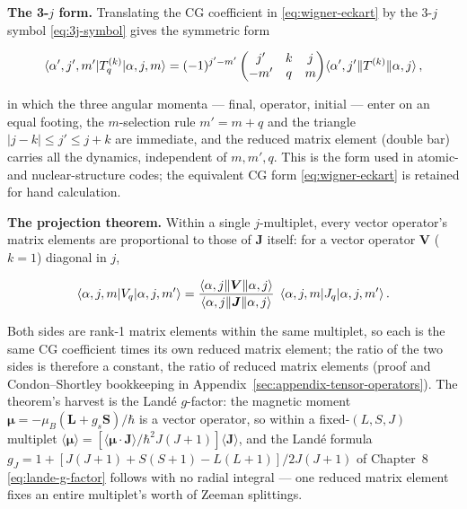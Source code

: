 \medskip\noindent\textbf{The 3-$j$ form.} Translating the CG coefficient in \eqref{eq:wigner-eckart} by the 3-$j$ symbol \eqref{eq:3j-symbol} gives the symmetric form
\begin{linenomath}
  \begin{equation}
    \braket{\alpha',j',m'|T^{(k)}_{q}|\alpha,j,m}
    =(-1)^{j'-m'}\begin{pmatrix}j'&k&j\\ -m'&q&m\end{pmatrix}\!\braket{\alpha',j'\|T^{(k)}\|\alpha,j},
    \label{eq:we-3j-ch6}
  \end{equation}
\end{linenomath}
in which the three angular momenta --- final, operator, initial --- enter on an equal footing, the $m$-selection rule $m'=m+q$ and the triangle $|j-k|\le j'\le j+k$ are immediate, and the reduced matrix element (double bar) carries all the dynamics, independent of $m,m',q$. This is the form used in atomic- and nuclear-structure codes; the equivalent CG form \eqref{eq:wigner-eckart} is retained for hand calculation.

\medskip\noindent\textbf{The projection theorem.} Within a single $j$-multiplet, every vector operator's matrix elements are proportional to those of $\bm J$ itself: for a vector operator $\bm V$ ($k=1$) diagonal in $j$,
\begin{linenomath}
  \begin{equation}
    \braket{\alpha,j,m|V_{q}|\alpha,j,m'}=\frac{\braket{\alpha,j\|\bm V\|\alpha,j}}{\braket{\alpha,j\|\bm J\|\alpha,j}}\;\braket{\alpha,j,m|J_{q}|\alpha,j,m'}.
    \label{eq:projection-theorem-ch6}
  \end{equation}
\end{linenomath}
Both sides are rank-1 matrix elements within the same multiplet, so each is the same CG coefficient times its own reduced matrix element; the ratio of the two sides is therefore a constant, the ratio of reduced matrix elements (proof and Condon--Shortley bookkeeping in Appendix~\ref{sec:appendix-tensor-operators}). The theorem's harvest is the Land\'e $g$-factor: the magnetic moment $\bm\mu=-\mu_{B}(\bm L+g_{s}\bm S)/\hbar$ is a vector operator, so within a fixed-$(L,S,J)$ multiplet $\langle\bm\mu\rangle=[\langle\bm\mu\!\cdot\!\bm J\rangle/\hbar^{2}J(J{+}1)]\langle\bm J\rangle$, and the Land\'e formula $g_{J}=1+[J(J{+}1)+S(S{+}1)-L(L{+}1)]/2J(J{+}1)$ of Chapter~8 \eqref{eq:lande-g-factor} follows with no radial integral --- one reduced matrix element fixes an entire multiplet's worth of Zeeman splittings.

